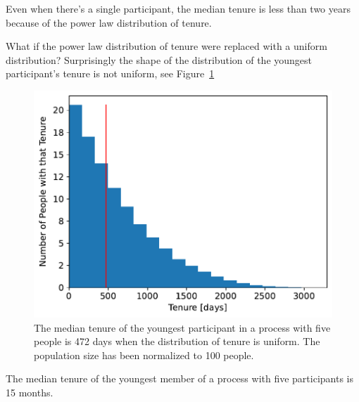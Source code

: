 Even when there's a single participant, the median tenure is less than two years because of the power law distribution of tenure.

What if the power law distribution of tenure were replaced with a uniform distribution?
Surprisingly the shape of the distribution of the youngest participant's tenure is not uniform, see Figure~\ref{fig:tenure-uniform-5-participants}

\begin{figure}[!htb]  %
    \centering
    \includegraphics[width=1\textwidth]{images/tenure_uniform_distribution_with_max_tenure10_and_5_participants_median472.pdf}
    \caption{The median tenure of the youngest participant
 in a process with five people is 472 days when the distribution of tenure is uniform. The population size has been normalized to 100 people.}
    \label{fig:tenure-uniform-5-participants}
\end{figure}

The median tenure of the youngest member of a process with five participants is 15 months. 

\FloatBarrier